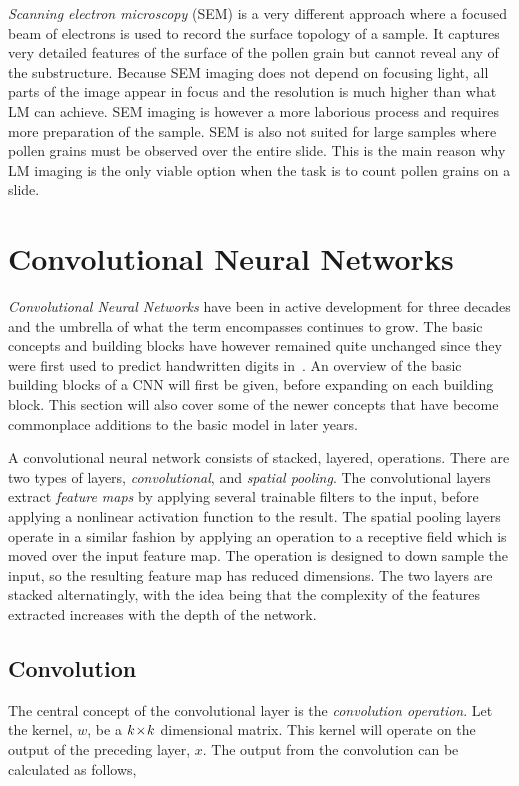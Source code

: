 \textit{Scanning electron microscopy} (SEM) is a very different approach where a focused beam of electrons is used to record the surface topology of a sample.
It captures very detailed features of the surface of the pollen grain but cannot reveal any of the substructure.
Because SEM imaging does not depend on focusing light, all parts of the image appear in focus and the resolution is much higher than what LM can achieve.
SEM imaging is however a more laborious process and requires more preparation of the sample.
SEM is also not suited for large samples where pollen grains must be observed over the entire slide.
This is the main reason why LM imaging is the only viable option when the task is to count pollen grains on a slide.

\section{Convolutional Neural Networks}\label{sec:back-cnn}
\emph{Convolutional Neural Networks} have been in active development for three decades and the umbrella of what the term encompasses continues to grow.
The basic concepts and building blocks have however remained quite unchanged since they were first used to predict handwritten digits in\ \textcite{1989Hdrw}.
An overview of the basic building blocks of a CNN will first be given, before expanding on each building block.
This section will also cover some of the newer concepts that have become commonplace additions to the basic model in later years.

A convolutional neural network consists of stacked, layered, operations.
There are two types of layers, \textit{convolutional}, and \textit{spatial pooling}.
The convolutional layers extract \textit{feature maps} by applying several trainable filters to the input, before applying a nonlinear activation function to the result.
The spatial pooling layers operate in a similar fashion by applying an operation to a receptive field which is moved over the input feature map.
The operation is designed to down sample the input, so the resulting feature map has reduced dimensions.
The two layers are stacked alternatingly, with the idea being that the complexity of the features extracted increases with the depth of the network.

\subsection{Convolution}
The central concept of the convolutional layer is the \textit{convolution operation}.
Let the kernel, \(w\), be a \(k\!\times \! k\) dimensional matrix.
This kernel will operate on the output of the preceding layer, \(x\).
The output from the convolution can be calculated as follows,

